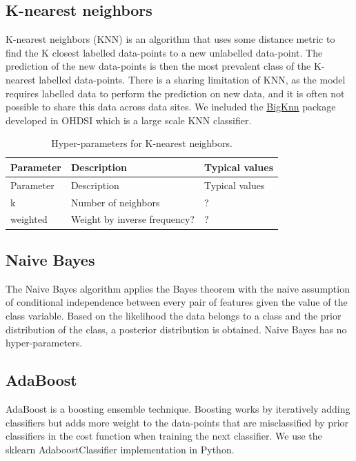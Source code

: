 \documentclass[11pt]{book}
\theoremstyle{definition}
\theoremstyle{definition}
\theoremstyle{definition}
\theoremstyle{remark}
\begin{document}
\hypertarget{k-nearest-neighbors}{%
\subsection{K-nearest neighbors}\label{k-nearest-neighbors}}

K-nearest neighbors (KNN) is an algorithm that uses some distance metric to find the K closest labelled data-points to a new unlabelled data-point. The prediction of the new data-points is then the most prevalent class of the K-nearest labelled data-points. There is a sharing limitation of KNN, as the model requires labelled data to perform the prediction on new data, and it is often not possible to share this data across data sites. We included the \href{https://github.com/OHDSI/BigKnn}{BigKnn} package developed in OHDSI which is a large scale KNN classifier.

\begin{longtable}[]{@{}lll@{}}
\caption{\label{tab:knnParameters} Hyper-parameters for K-nearest neighbors.}\tabularnewline
\toprule
Parameter & Description & Typical values\tabularnewline
\midrule
\endfirsthead
\toprule
Parameter & Description & Typical values\tabularnewline
\midrule
\endhead
k & Number of neighbors & ?\tabularnewline
weighted & Weight by inverse frequency? & ?\tabularnewline
\bottomrule
\end{longtable}

\hypertarget{naive-bayes}{%
\subsection{Naive Bayes}\label{naive-bayes}}

The Naive Bayes algorithm applies the Bayes theorem with the naive assumption of conditional independence between every pair of features given the value of the class variable. Based on the likelihood the data belongs to a class and the prior distribution of the class, a posterior distribution is obtained. Naive Bayes has no hyper-parameters.

\hypertarget{adaboost}{%
\subsection{AdaBoost}\label{adaboost}}

AdaBoost is a boosting ensemble technique. Boosting works by iteratively adding classifiers but adds more weight to the data-points that are misclassified by prior classifiers in the cost function when training the next classifier. We use the sklearn AdaboostClassifier implementation in Python.
\end{document}

